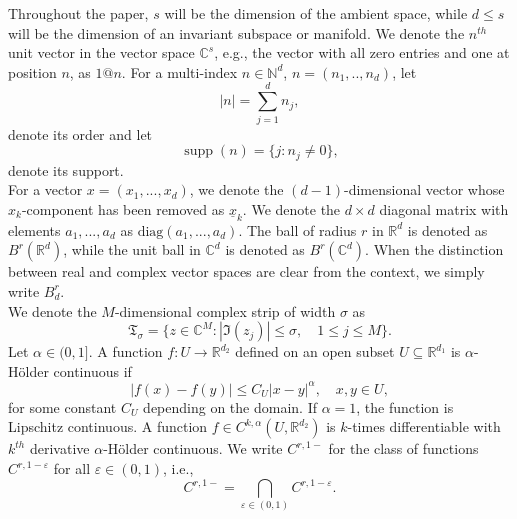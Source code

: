 \documentclass{amsart}
\newcommand{\depth}{\mathrm{depth}}
\newcommand{\diag}{\mathrm{diag}}
\theoremstyle{plain}
\theoremstyle{definition}
\begin{document}
Throughout the paper, $s$ will be the dimension of the ambient space, while $d\leq s$ will be the dimension of an invariant subspace or manifold. We denote the $n^{th}$ unit vector in the vector space $\mathbb{C}^s$, e.g., the vector with all zero entries and one at position $n$, as $1@n$. For a multi-index $n\in\mathbb{N}^d$, $n=(n_1,..,n_d)$, let
\begin{equation}
    |n| = \sum_{j=1}^d n_j,
\end{equation}
denote its order and let
\begin{equation}
    \operatorname{supp}(n) = \{j: n_j\neq 0\},
\end{equation}
denote its support.\\
For a vector $x=(x_1,...,x_d)$, we denote the $(d-1)$-dimensional vector whose $x_k$-component has been removed as $\underline{x}_k$. We denote the $d\times d$ diagonal matrix with elements $a_1,...,a_d$ as $\diag(a_1,...,a_d)$. The ball of radius $r$ in $\mathbb{R}^d$ is denoted as $B^r({\mathbb{R}^d})$, while the unit ball in $\mathbb{C}^d$ is denoted as $B^r({\mathbb{C}^d})$. When the distinction between real and complex vector spaces are clear from the context, we simply write $B^r_d$.\\
We denote the $M$-dimensional complex strip of width $\sigma$ as 
\begin{equation}\label{def_strip}
    \mathfrak{T}_\sigma = \{z\in \mathbb{C}^M: |\Im(z_j)|\leq \sigma,\quad 1\leq j \leq M \}. 
 \end{equation}
Let $\alpha\in (0,1]$. A function $f:U\to\mathbb{R}^{d_2}$ defined on an open subset $U\subseteq\mathbb{R}^{d_1}$ is $\alpha$-H\"{o}lder continuous if
\begin{equation}
    |f(x)-f(y)|\leq C_U |x-y|^\alpha,\quad x,y\in U,
\end{equation}
for some constant $C_U$ depending on the domain. If $\alpha=1$, the function is Lipschitz continuous. A function $f\in C^{k,\alpha}(U,\mathbb{R}^{d_2})$ is $k$-times differentiable with $k^{th}$ derivative $\alpha$-H\"{o}lder continuous. We write $C^{r,1-}$ for the class of functions $C^{r,1-\varepsilon}$ for all $\varepsilon\in (0,1)$, i.e.,
\begin{equation}\label{def_C_1_minus}
    C^{r,1-} = \bigcap_{\varepsilon\in (0,1)} C^{r,1-\varepsilon}.
\end{equation}
\end{document}
